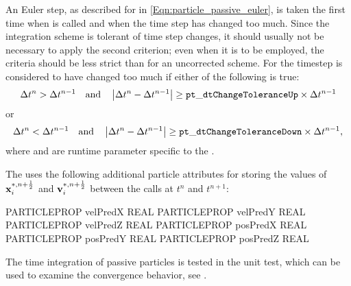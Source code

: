 \begin{itemize}
An Euler step, as described for  in \eqref{Eqn:particle_passive_euler}, 
 is taken the first time when
 is called and when the
time step has changed too much. 
Since the integration scheme is tolerant of time step changes, it should
usually not be necessary to apply the second criterion; even when it is to be employed,
the criteria should be less strict than for an uncorrected  scheme.
For  the timestep is considered to have changed too much
if either of the following is true:
\begin{displaymath}
     \Delta t^{n} > \Delta t^{n-1} 
\quad\mbox{and}\quad
    \left| \Delta t^{n} - \Delta t^{n-1} \right| \geq
                                                      {\tt pt\_dtChangeToleranceUp} \times  \Delta t^{n-1}
\end{displaymath}
or 
\begin{displaymath}
     \Delta t^{n} < \Delta t^{n-1} 
\quad\mbox{and}\quad
    \left| \Delta t^{n} - \Delta t^{n-1} \right| \geq
                                                      {\tt pt\_dtChangeToleranceDown} \times  \Delta t^{n-1},
\end{displaymath}
where  and  are runtime parameter
specific to the  \childunit.



The  \childunit uses the following additional particle attributes
for storing the values of ${\bf x}_i^{*,n+\frac12}$ and ${\bf v}_i^{*,n+\frac12}$ between the  calls at $t^n$
and $t^{n+1}$:
\begin{codeseg}
PARTICLEPROP velPredX REAL
PARTICLEPROP velPredY REAL
PARTICLEPROP velPredZ REAL
PARTICLEPROP posPredX REAL
PARTICLEPROP posPredY REAL
PARTICLEPROP posPredZ REAL
\end{codeseg}

\end{itemize}


The time integration of passive particles is tested in the  unit test,
which can be used to examine the convergence behavior, see .




